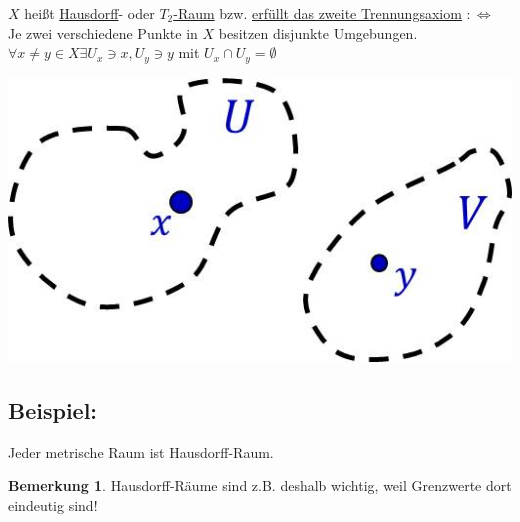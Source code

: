\documentclass[a4paper,11pt,notitlepage]{report}
\theoremstyle{definition}
\newtheorem{remark}{Bemerkung}[chapter]
\newenvironment{bsp}[1]
{
\setlength{\fboxsep}{10pt}
\subsection*{Beispiel: #1}
\begin{upshape}
}
{
\end{upshape}
}
\newenvironment{definition}[1]{
	\begin{definitions}
	\marginnote{\emph{#1}}
}{\end{definitions}}
\begin{document}
\begin{definition}{$T_2$-Raum}
	$X$ heißt \underline{Hausdorff}- oder \underline{$T_2$-Raum} bzw. \underline{erfüllt das zweite Trennungsaxiom} $:\Leftrightarrow$ Je zwei verschiedene Punkte in $X$ besitzen disjunkte Umgebungen.
	\newline
	$\forall x \neq y \in X \exists U_x \ni x, U_y \ni y$ mit $U_x \cap U_y = \emptyset$
\begin{center}
\includegraphics[scale=0.4]{images/T2.jpg}
\end{center}

\end{definition}

\begin{bsp}{}
	Jeder metrische Raum ist Hausdorff-Raum.
\end{bsp}

\begin{remark}
Hausdorff-Räume sind z.B. deshalb wichtig, weil Grenzwerte dort eindeutig sind!
\end{remark}
\end{document}
